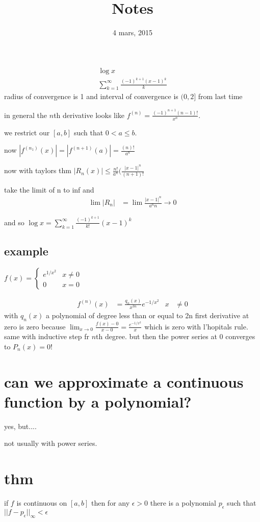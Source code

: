 \documentclass[letterpaper]{article}
\begin{document}
\title{Notes}
\date{4 mars, 2015}
\maketitle
\begin{align*}
  \log x\\
  \sum\limits_{k=1}^\infty{\frac{(-1)^{k+1}(x-1)^k}{k}}
\end{align*}
radius of convergence is 1 and interval of convergence is $(0,2]$ from last time


in general the $n$th derivative looks like $f^{(n)}=\frac{(-1)^{n+1}(n-1)!}{x^n}$. 

we restrict our $[a,b]$ such that $0<a\le b$.

now $|f^{(n_1)}(x)|=|f^{(n+1)}(a)|=\frac{(n)!}{a^n}$

now with taylors thm
$|R_n(x)|\le \frac{n!}{a^n}(\frac{|x-1|^n}{(n+1)!}$

take the limit of n to inf and
\begin{align*}
  \lim |R_n|&=\lim \frac{|x-1|^n}{a^nn}\to 0
\end{align*}

and so $\log x=\sum\limits_{k=1}^\infty{\frac{(-1)^{k+1}}{k!}(x-1)^k}$

\subsection*{example}
$f(x)=\begin{cases}e^{1/x^2}&x\ne 0\\0&x=0\end{cases}$

\begin{align*}
  f^{(n)}(x)&=\frac{q_n(x)}{x^{3n}}e^{-1/x^2}&x&\ne 0
\end{align*}
with $q_n(x)$ a polynomial of degree less than or equal to 2n
first derivative at zero is zero because $\lim_{x\to 0}\frac{f(x)-0}{x-0}=\frac{e^{-1/x^2}}{x}$ which is zero with l'hopitals rule. same with inductive step fr $n$th degree. but then the power series at 0 converges to $P_n(x)=0$!


\section*{can we approximate a continuous function by a polynomial?}

yes, but....

not usually with power series.

\section*{thm}
if $f$ is continuous on $[a,b]$ then for any $\epsilon>0$ there is a polynomial $p_\epsilon$ such that $||f-p_\epsilon||_\infty<\epsilon$
\end{document}
